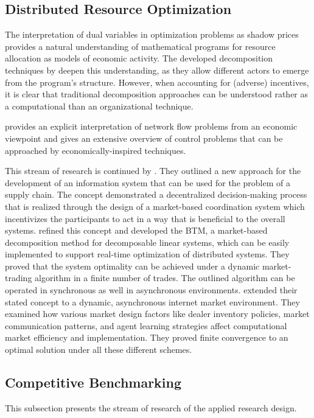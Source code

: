 \subsection{Distributed Resource Optimization}
\label{sec:Distributed Resource Optimization}

The interpretation of dual variables in optimization problems as shadow prices provides a natural understanding of mathematical programs
for resource allocation as models of economic activity. 
The developed decomposition techniques by  deepen this understanding, as they allow different actors to emerge 
from the program's structure. However, when accounting for (adverse) incentives, 
it is clear that traditional decomposition approaches can be understood rather as a computational than an organizational technique.  

 provides an explicit interpretation of network flow problems from an economic viewpoint and 
 gives an extensive overview of control problems 
that can be approached by economically-inspired techniques.

This stream of research is continued by . They outlined a new approach for the 
development of an information system
that can be used for the problem of a supply chain. The concept demonstrated a decentralized
decision-making process that is realized through the design of a market-based coordination
system which incentivizes the participants to act in a way that is beneficial to the overall
systems.  refined this concept
and developed the BTM, a market-based decomposition method for decomposable linear systems,
which can be easily implemented to support real-time optimization of distributed
systems. They proved that the system optimality can be
achieved under a dynamic market-trading algorithm in a finite number of trades.
The outlined algorithm can be operated in synchronous as well in
asynchronous environments.  extended 
their stated concept to a dynamic, asynchronous internet market environment.
They examined how various market design factors like dealer inventory
policies, market communication patterns, and agent learning strategies affect
computational market efficiency and implementation. 
They proved finite convergence to an optimal solution under all these different schemes.

\subsection{Competitive Benchmarking}
This subsection presents the stream of research of the applied research design.

